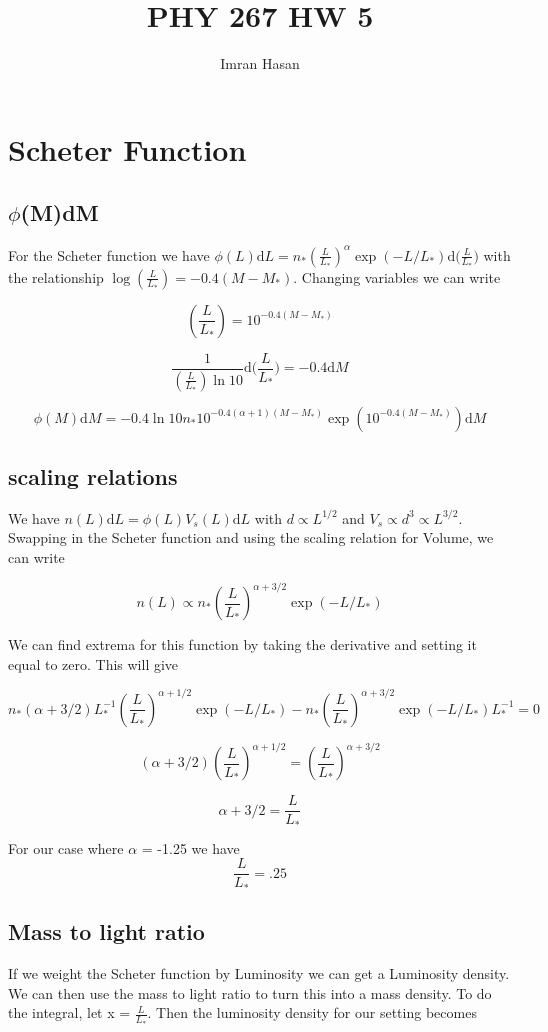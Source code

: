 \documentclass[12pt]{article}
\begin{document}
\title{PHY 267 HW 5}
\author{Imran Hasan}
\maketitle

\section{Scheter Function}
\subsection{$\phi$(M)dM}
For the Scheter function we have $\phi(L)\mathrm{d}L = n_{*} (\frac{L}{L_*})^{\alpha} \exp(-L/L_{*}) \mathrm{d}\big(\frac{L}{L_*}\big)$ with the relationship $\log(\frac{L}{L_*}) = -0.4(M - M_{*})$. Changing variables we can write

$$(\frac{L}{L_*}) = 10^{-0.4(M - M_{*})} $$

$$\frac{1}{(\frac{L}{L_*}) \ln 10} \mathrm{d}\Big(\frac{L}{L_*}\Big) = -0.4\mathrm{d}M$$

$$ \phi(M)\mathrm{d}M = -0.4 \ln 10 n_{*}10^{-0.4 (\alpha + 1) (M - M_{*})} \exp(10^{-0.4(M - M_{*})})  \mathrm{d}M$$

\subsection{scaling relations}
We have $n(L) \mathrm{d} L = \phi(L) V_{s}(L) \mathrm{d}L$ with $ d \propto L^{1/2}$ and $V_{s} \propto d^3 \propto L^{3/2} $. Swapping in the Scheter function and using the scaling relation for Volume, we can write

$$n(L) \propto n_{*} (\frac{L}{L_*})^{\alpha + 3/2} \exp(-L/L_{*})$$

We can find extrema for this function by taking the derivative and setting it equal to zero. This will give 

$$ n_{*} (\alpha + 3/2) L_{*}^{-1} (\frac{L}{L_*})^{\alpha + 1/2} \exp(-L/L_{*}) -  n_{*} (\frac{L}{L_*})^{\alpha + 3/2} \exp(-L/L_{*}) L_{*}^{-1}= 0$$

$$  (\alpha + 3/2)  (\frac{L}{L_*})^{\alpha + 1/2} =  (\frac{L}{L_*})^{\alpha + 3/2}  $$

$$ \alpha + 3/2   =  \frac{L}{L_*} $$

For our case where $\alpha$ = -1.25 we have 
$$\frac{L}{L_*} = .25$$ 
\subsection{Mass to light ratio}
If we weight the Scheter function by Luminosity we can get a Luminosity density. We can then use the mass to light ratio to turn this into a mass density. To do the integral, let x = $\frac{L}{L_*}$. Then the luminosity density for our setting becomes 
\end{document}
